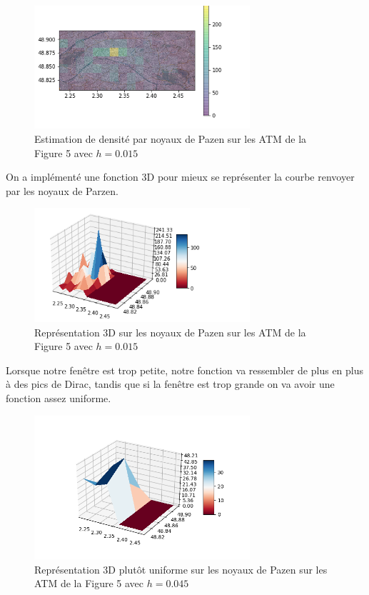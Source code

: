 \documentclass{article}
\begin{document}
\begin{figure}[h]
	\center
	\includegraphics[width=8cm]{figure/tme2/parzenh=015.png} 
	 \caption{Estimation de densité par noyaux de Pazen sur les ATM de la Figure 5 avec $h=0.015$ }
	 
\end{figure}
On a implémenté une fonction 3D pour mieux se représenter la courbe renvoyer par les noyaux de Parzen.
\begin{figure}[h]
	\center
	\includegraphics[width=8cm]{figure/tme2/parzen3Dh=015.png} 
	 \caption{Représentation 3D sur les noyaux de Pazen sur les ATM de la Figure 5 avec $h=0.015$ }
	 
\end{figure}
Lorsque notre fenêtre est trop petite, notre fonction va ressembler de plus en plus à des pics de Dirac, tandis que si la fenêtre est trop grande on va avoir une fonction assez uniforme.
\begin{figure}[h]
	\center
	\includegraphics[width=8cm]{../tme2/parzen3Dh=045.png} 
	 \caption{Représentation 3D plutôt uniforme sur les noyaux de Pazen sur les ATM de la Figure 5 avec $h=0.045$ }
	 
\end{figure}
\end{document}
